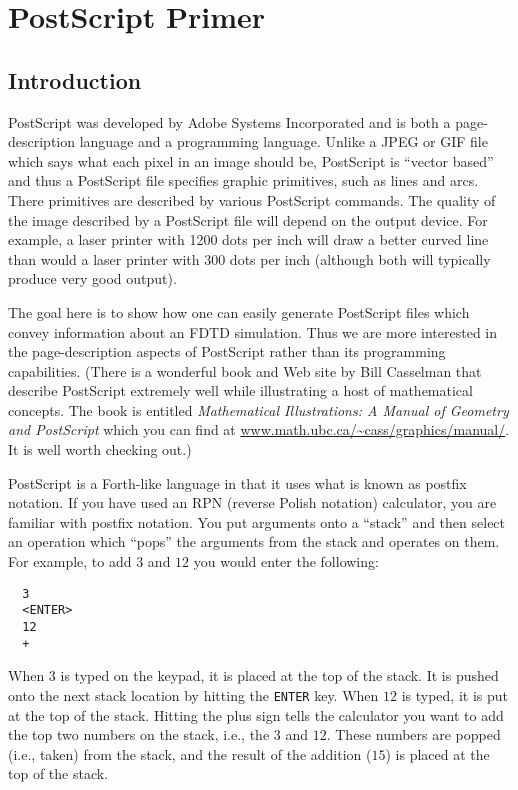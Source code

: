 \chapter{PostScript Primer}


\renewcommand{\thefootnote}{\fnsymbol{footnote}}

\section{Introduction}

PostScript was developed by Adobe Systems Incorporated and is both a
page-description language and a programming language.  Unlike a JPEG
or GIF file which says what each pixel in an image should be,
PostScript is ``vector based'' and thus a PostScript file specifies
graphic primitives, such as lines and arcs.  There primitives are
described by various PostScript commands.  The quality of the image
described by a PostScript file will depend on the output device.  For
example, a laser printer with 1200 dots per inch will draw a better
curved line than would a laser printer with 300 dots per inch
(although both will typically produce very good output).

The goal here is to show how one can easily generate PostScript files
which convey information about an FDTD simulation.  Thus we are more
interested in the page-description aspects of PostScript rather than
its programming capabilities.  (There is a wonderful book and Web site
by Bill Casselman that describe PostScript extremely well while
illustrating a host of mathematical concepts.  The book is entitled
{\em Mathematical Illustrations: A Manual of Geometry and PostScript}
which you can find at \url{www.math.ubc.ca/~cass/graphics/manual/}.
It is well worth checking out.)

PostScript is a Forth-like language in that it uses what is known as
postfix notation.  If you have used an RPN (reverse Polish notation)
calculator, you are familiar with postfix notation.  You put arguments
onto a ``stack'' and then select an operation which ``pops'' the
arguments from the stack and operates on them.  For example, to add
$3$ and $12$ you would enter the following:
\begin{verbatim}
  3
  <ENTER>
  12
  +
\end{verbatim}
When $3$ is typed on the keypad, it is placed at the top of the stack.
It is pushed onto the next stack location by hitting the {\tt ENTER}
key.  When $12$ is typed, it is put at the top of the stack.  Hitting
the plus sign tells the calculator you want to add the top two numbers
on the stack, i.e., the $3$ and $12$.  These numbers are popped (i.e.,
taken) from the stack, and the result of the addition ($15$) is placed
at the top of the stack.


